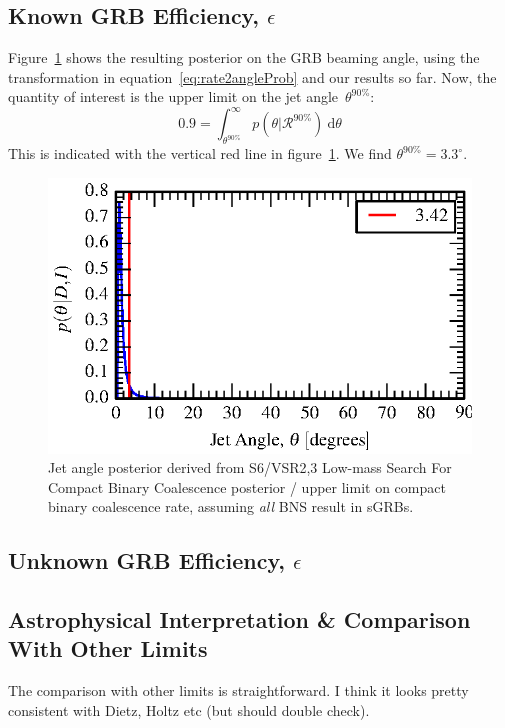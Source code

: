 \documentclass[nofootinbib]{revtex4}
\newcommand{\cbcrate}{{{\mathcal R}}}
\newcommand{\diff}{{\mathrm d}}
\begin{document}
\subsection{Known GRB Efficiency, $\epsilon$}

Figure~\ref{fig:jetPosterior} shows the resulting posterior on the GRB
beaming angle, using the transformation in equation~\ref{eq:rate2angleProb} and
our results so far.  
%
Now, the quantity of interest is the upper limit on the jet
angle~$\theta^{90\%}$:
%
\begin{equation}
0.9 = \int_{\theta^{90\%}}^{\infty}p(\theta | \cbcrate^{90\%})~\diff \theta
\end{equation}
%
This is indicated with the vertical red line in figure~\ref{fig:jetPosterior}.
We find $\theta^{90\%}=3.3^{\circ}$.


\begin{figure}
\includegraphics{jet_angle_posterior_s6UL_TEST_deltaEffPrior-1.0.eps}
\caption{Jet angle posterior derived from S6/VSR2,3 Low-mass Search For Compact Binary
Coalescence posterior / upper limit on compact binary coalescence
rate, assuming \emph{all} BNS result in sGRBs.\label{fig:jetPosterior}}
\end{figure}


\subsection{Unknown GRB Efficiency, $\epsilon$}


\subsection{Astrophysical Interpretation \& Comparison With Other Limits}
The comparison with other limits is straightforward.  I think it looks pretty
consistent with Dietz, Holtz etc (but should double check).
\end{document}
